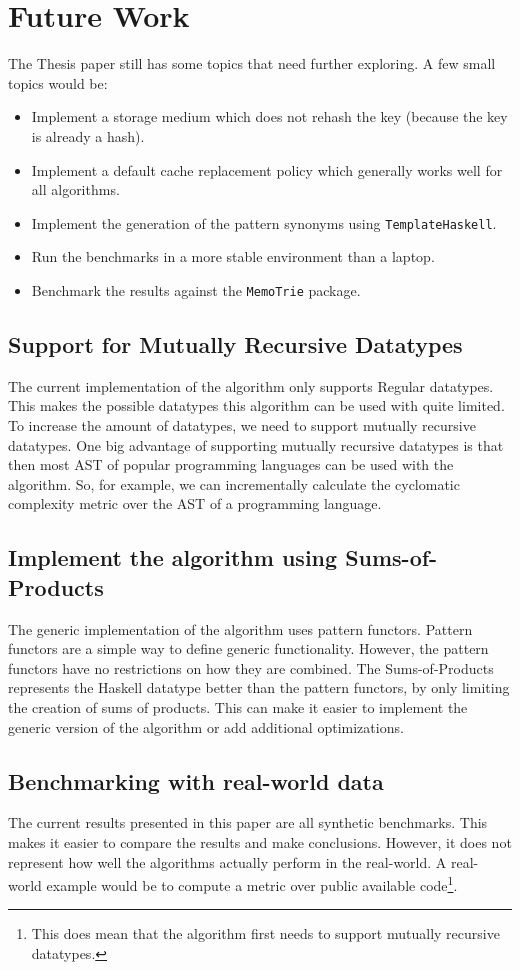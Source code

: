 \section{Future Work}

The Thesis paper still has some topics that need further exploring. A few small topics would be: 
\begin{itemize}
  \item Implement a storage medium which does not rehash the key (because the key is already a hash).
  \item Implement a default cache replacement policy which generally works well for all algorithms. 
  \item Implement the generation of the pattern synonyms using \texttt{TemplateHaskell}.
  \item Run the benchmarks in a more stable environment than a laptop.
  \item Benchmark the results against the \texttt{MemoTrie} package.
\end{itemize}

\subsection{Support for Mutually Recursive Datatypes}
The current implementation of the algorithm only supports Regular datatypes. This makes the possible datatypes this algorithm can be used with quite limited. To increase the amount of datatypes, we need to support mutually recursive datatypes. One big advantage of supporting mutually recursive datatypes is that then most AST of popular programming languages can be used with the algorithm. So, for example, we can incrementally calculate the cyclomatic complexity metric over the AST of a programming language.

\subsection{Implement the algorithm using Sums-of-Products}
The generic implementation of the algorithm uses pattern functors. Pattern functors are a simple way to define generic functionality. However, the pattern functors have no restrictions on how they are combined. The Sums-of-Products represents the Haskell datatype better than the pattern functors, by only limiting the creation of sums of products. This can make it easier to implement the generic version of the algorithm or add additional optimizations.

\subsection{Benchmarking with real-world data}
The current results presented in this paper are all synthetic benchmarks. This makes it easier to compare the results and make conclusions. However, it does not represent how well the algorithms actually perform in the real-world. A real-world example would be to compute a metric over public available code\footnote{This does mean that the algorithm first needs to support mutually recursive datatypes.}.